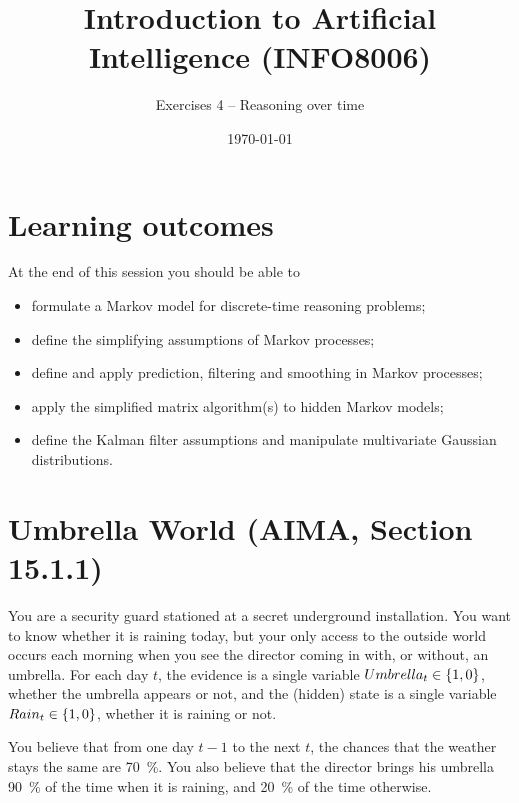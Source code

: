 \documentclass[11pt, a4paper]{article}
\title{Introduction to Artificial Intelligence (INFO8006)}
\subtitle{Exercises 4 -- Reasoning over time}
\date{\today}
\begin{document}
\maketitle

\section*{Learning outcomes}

At the end of this session you should be able to
\begin{itemize}[noitemsep]
    \item formulate a Markov model for discrete-time reasoning problems;
    \item define the simplifying assumptions of Markov processes;
    \item define and apply prediction, filtering and smoothing in Markov processes;
    \item apply the simplified matrix algorithm(s) to hidden Markov models;
    \item define the Kalman filter assumptions and manipulate multivariate Gaussian distributions.
\end{itemize}

\section{Umbrella World (AIMA, Section 15.1.1)}

You are a security guard stationed at a secret underground installation. You want to know whether it is raining today, but your only access to the outside world occurs each morning when you see the director coming in with, or without, an umbrella. For each day $t$, the evidence is a single variable $Umbrella_t \in \{1, 0\}$, \ie{} whether the umbrella appears or not, and the (hidden) state is a single variable $Rain_t \in \{1, 0\}$, \ie{} whether it is raining or not.

You believe that from one day $t - 1$ to the next $t$, the chances that the weather stays the same are \SI{70}{\percent}. You also believe that the director brings his umbrella \SI{90}{\percent} of the time when it is raining, and \SI{20}{\percent} of the time otherwise.
\end{document}
